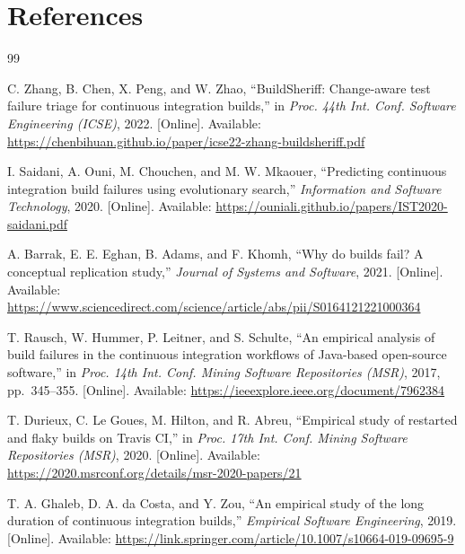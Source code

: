 \chapter{References}
\label{ch:references}
\renewcommand{\bibname}{}
\begingroup
\renewcommand{\chapter}[2]{}%
\small
\begin{thebibliography}{99}
\setlength{\itemsep}{3pt}

 C. Zhang, B. Chen, X. Peng, and W. Zhao, ``BuildSheriff: Change-aware test failure triage for continuous integration builds,'' in \emph{Proc. 44th Int. Conf. Software Engineering (ICSE)}, 2022. [Online]. Available: \url{https://chenbihuan.github.io/paper/icse22-zhang-buildsheriff.pdf}

 I. Saidani, A. Ouni, M. Chouchen, and M. W. Mkaouer, ``Predicting continuous integration build failures using evolutionary search,'' \emph{Information and Software Technology}, 2020. [Online]. Available: \url{https://ouniali.github.io/papers/IST2020-saidani.pdf}

 A. Barrak, E. E. Eghan, B. Adams, and F. Khomh, ``Why do builds fail? A conceptual replication study,'' \emph{Journal of Systems and Software}, 2021. [Online]. Available: \url{https://www.sciencedirect.com/science/article/abs/pii/S0164121221000364}

 T. Rausch, W. Hummer, P. Leitner, and S. Schulte, ``An empirical analysis of build failures in the continuous integration workflows of Java-based open-source software,'' in \emph{Proc. 14th Int. Conf. Mining Software Repositories (MSR)}, 2017, pp.~345--355. [Online]. Available: \url{https://ieeexplore.ieee.org/document/7962384}

 T. Durieux, C. Le Goues, M. Hilton, and R. Abreu, ``Empirical study of restarted and flaky builds on Travis CI,'' in \emph{Proc. 17th Int. Conf. Mining Software Repositories (MSR)}, 2020. [Online]. Available: \url{https://2020.msrconf.org/details/msr-2020-papers/21}

 T. A. Ghaleb, D. A. da Costa, and Y. Zou, ``An empirical study of the long duration of continuous integration builds,'' \emph{Empirical Software Engineering}, 2019. [Online]. Available: \url{https://link.springer.com/article/10.1007/s10664-019-09695-9}


\end{thebibliography}
